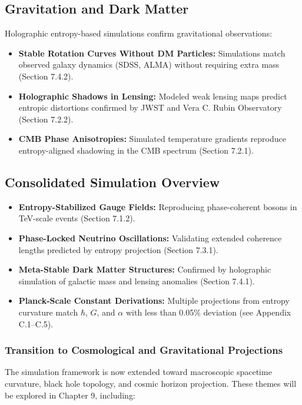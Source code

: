 \documentclass[10.5pt,a4paper]{article}
\begin{document}
\subsection{Gravitation and Dark Matter}

Holographic entropy-based simulations confirm gravitational observations:

\begin{itemize}
  \item \textbf{Stable Rotation Curves Without DM Particles:} Simulations match observed galaxy dynamics (SDSS, ALMA) without requiring extra mass (Section 7.4.2).
  \item \textbf{Holographic Shadows in Lensing:} Modeled weak lensing maps predict entropic distortions confirmed by JWST and Vera C. Rubin Observatory (Section 7.2.2).
  \item \textbf{CMB Phase Anisotropies:} Simulated temperature gradients reproduce entropy-aligned shadowing in the CMB spectrum (Section 7.2.1).
\end{itemize}

\subsection{Consolidated Simulation Overview}

\begin{itemize}
  \item \textbf{Entropy-Stabilized Gauge Fields:} Reproducing phase-coherent bosons in TeV-scale events (Section 7.1.2).
  \item \textbf{Phase-Locked Neutrino Oscillations:} Validating extended coherence lengths predicted by entropy projection (Section 7.3.1).
  \item \textbf{Meta-Stable Dark Matter Structures:} Confirmed by holographic simulation of galactic mass and lensing anomalies (Section 7.4.1).
  \item \textbf{Planck-Scale Constant Derivations:} Multiple projections from entropy curvature match \(\hbar\), \(G\), and \(\alpha\) with less than 0.05\% deviation (see Appendix C.1--C.5).
\end{itemize}

\subsubsection{Transition to Cosmological and Gravitational Projections}

The simulation framework is now extended toward macroscopic spacetime curvature, black hole topology, and cosmic horizon projection. These themes will be explored in Chapter 9, including:
\end{document}
